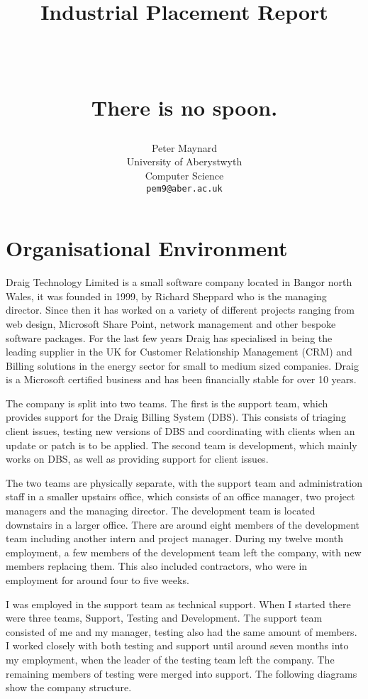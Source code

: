 \documentclass[paper=a4, fontsize=11pt]{scrartcl}	%
\title{ \vspace{-1in} 	\usefont{OT1}{bch}{b}{n}
		\huge \strut Industrial Placement Report \strut \\
		\Large \bfseries \strut There is no spoon. \strut
}
\author{ 									\usefont{OT1}{bch}{m}{n}
        Peter Maynard\\		\usefont{OT1}{bch}{m}{n}
        University of Aberystwyth\\	\usefont{OT1}{bch}{m}{n}
        Computer Science\\
        \texttt{pem9@aber.ac.uk}
}
\date{}
\begin{document}
\maketitle
\section{Organisational Environment}
Draig Technology Limited is a small software company located in Bangor north Wales, it was founded in 1999, by Richard Sheppard who is the managing director.  Since then it has worked on a variety of different projects ranging from web design, Microsoft Share Point, network management and other bespoke software packages. For the last few years Draig has specialised in being the leading supplier in the UK for Customer Relationship Management (CRM) and Billing solutions in the energy sector for small to medium sized companies. Draig is a Microsoft certified business and has been financially stable for over 10 years. 

The company is split into two teams. The first is the support team, which provides support for the Draig Billing System (DBS).  This consists of triaging client issues, testing new versions of DBS and coordinating with clients when an update or patch is to be applied. The second team is development, which mainly works on DBS, as well as providing support for client issues.

The two teams are physically separate, with the support team and administration staff in a smaller upstairs office, which consists of an office manager, two project managers and the managing director. The development team is located downstairs in a larger office. There are around eight members of the development team including another intern and project manager. During my twelve month employment, a few members of the development team left the company, with new members replacing them. This also included contractors, who were in employment for around four to five weeks.
 
I was employed in the support team as technical support. When I started there were three teams, Support, Testing and Development. The support team consisted of me and my manager, testing also had the same amount of members. I worked closely with both testing and support until around seven months into my employment, when the leader of the testing team left the company. The remaining members of testing were merged into support. The following diagrams show the company structure.

\end{document}
